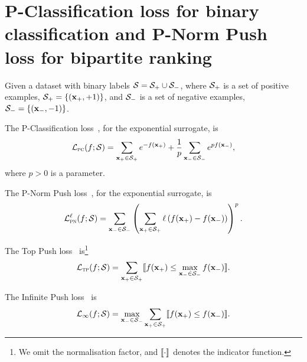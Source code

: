 \section{P-Classification loss for binary classification and P-Norm Push loss for bipartite ranking}
\label{sec:binary}

Given a dataset with binary labels $\mathcal{S} = \mathcal{S}_+ \cup \mathcal{S}_-$, where $\mathcal{S}_+$ is a set of positive examples, 
\ie $\mathcal{S}_+ = \{(\mathbf{x}_+, +1)\}$, and $\mathcal{S}_-$ is a set of negative examples, \ie $\mathcal{S}_- = \{(\mathbf{x}_-, -1)\}$.

The P-Classification loss~\cite{ertekin2011equivalence}, for the exponential surrogate, is
\begin{equation*}
\mathcal{L}_\textsc{pc}(f; \mathcal{S}) 
= \sum_{\mathbf{x}_+ \in \mathcal{S}_+} e^{-f(\mathbf{x}_+)} + \frac{1}{p} \sum_{\mathbf{x}_- \in \mathcal{S}_-} e^{p f(\mathbf{x}_-)},
\end{equation*}
where $p > 0$ is a parameter.

The P-Norm Push loss~\cite{rudin2009p}, for the exponential surrogate, is
\begin{equation*}
\mathcal{L}_\textsc{pn}^\ell (f; \mathcal{S})
= \sum_{\mathbf{x}_- \in \mathcal{S}_-} \left( \sum_{\mathbf{x}_+ \in \mathcal{S}_+} \ell \left( f(\mathbf{x}_+) - f(\mathbf{x}_-) \right) \right)^p.
\end{equation*}

The Top Push loss~\cite{li2014top} is\footnote{We omit the normalisation factor, and $\llbracket \cdot \rrbracket$ denotes the indicator function.}
\begin{equation*}
\mathcal{L}_\textsc{tp}(f; \mathcal{S})
= \sum_{\mathbf{x}_+ \in \mathcal{S}_+} \llbracket f(\mathbf{x}_+) \le \max_{\mathbf{x}_- \in \mathcal{S}_-} f(\mathbf{x}_-) \rrbracket.
\end{equation*}

The Infinite Push loss~\cite{rudin2009p} is
\begin{equation*}
\mathcal{L}_\infty(f; \mathcal{S})
= \max_{\mathbf{x}_- \in \mathcal{S}_-} \sum_{\mathbf{x}_+ \in \mathcal{S}_+} \llbracket f(\mathbf{x}_+) \le f(\mathbf{x}_-) \rrbracket.
\end{equation*}

